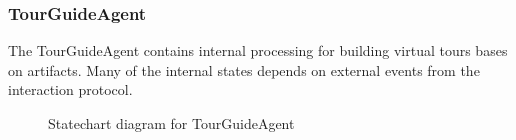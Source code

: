 \documentclass[paper=letter, fontsize=12pt]{article}
\begin{document}
\subsubsection{TourGuideAgent}
The TourGuideAgent contains internal processing for building virtual tours bases on artifacts. Many of the internal states depends on external events from the interaction protocol.
\begin{figure}[H]
  \begin{center}
    \caption{Statechart diagram for TourGuideAgent}
    \label{fig:tourguide_state}
  \end{center}
\end{figure}
\end{document}
